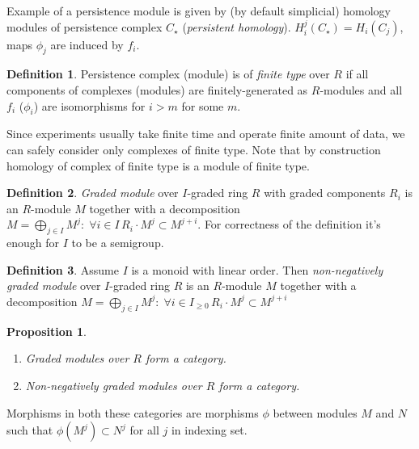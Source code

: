 \documentclass[a4paper, 12pt]{article}
\newtheorem{proposition}{Proposition}
\theoremstyle{definition}
\newtheorem{definition}{Definition}
\theoremstyle{remark}
\newcommand{\define}[1]{{\textit{#1}}}
\renewcommand{\geq}{\geqslant}
\begin{document}
Example of a persistence module is given by (by default simplicial) homology modules of persistence complex $C_{\star}$ (\define{persistent homology}). $H_i^j(C_{\star}) = H_i(C_{j})$, maps $\phi_j$ are induced by $f_i$.\\

\begin{definition}
  Persistence complex (module) is of \define{finite type} over $R$ if all components of complexes (modules) are finitely-generated as $R$-modules and all $f_i$ ($\phi_i$) are isomorphisms for $i > m$ for some $m$.
\end{definition}

Since experiments usually take finite time and operate finite amount of data, we can safely consider only complexes of finite type. Note that by construction homology of complex of finite type is a module of finite type.\\

\begin{definition}
  \define{Graded module} over $I$-graded ring $R$ with graded components $R_i$ is an $R$-module $M$ together with a decomposition $M = \bigoplus_{j \in I} M^j:\; \forall i \in I\, R_i \cdot M^j \subset M^{j+i}$. For correctness of the definition it's enough for $I$ to be a semigroup.
\end{definition}

\begin{definition}
  Assume $I$ is a monoid with linear order. Then \define{non-negatively graded module} over $I$-graded ring $R$ is an $R$-module $M$ together with a decomposition $M = \bigoplus_{j \in I} M^j:\; \forall i \in I_{\geq 0}\, R_i \cdot M^j \subset M^{j+i}$
\end{definition}

\begin{proposition} ~ \par
  \begin{enumerate}
    \item Graded modules over $R$ form a category.
    \item Non-negatively graded modules over $R$ form a category.
  \end{enumerate}
\end{proposition}

Morphisms in both these categories are morphisms $\phi$ between modules $M$ and $N$ such that $\phi(M^j) \subset N^j$ for all $j$ in indexing set.\\
\end{document}
